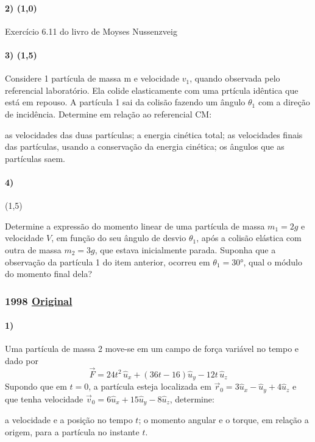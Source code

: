 \documentclass[12pt,a4paper]{article}
\newcommand{\original}[1]{\tiny \href{#1}{Original} \normalsize}
\begin{document}
\paragraph{2) (1,0)} Exercício 6.11 do livro de Moyses Nussenzveig

\paragraph{3) (1,5)} Considere 1 partícula de massa m e velocidade $v_1$, quando observada pelo referencial laboratório. Ela colide elasticamente com uma prtícula idêntica que está em repouso. A partícula 1 sai da colisão fazendo um ângulo $\theta _1$ com a direção de incidência. Determine em relação ao referencial CM:
\begin{tasks}
\task as velocidades das duas partículas;
\task a energia cinética total;
\task as velocidades finais das partículas, usando a conservação da energia cinética;
\task os ângulos que as partículas saem.
\end{tasks}

\paragraph{4)} (1,5)\\
\begin{tasks}
\task Determine a expressão do momento linear de uma partícula de massa $m_1 = 2g$ e velocidade $V$, em função do seu ângulo de desvio $\theta _1$, após a colisão elástica com outra de massa $m_2 = 3g$, que estava inicialmente parada.
\task Suponha que a observação da partícula 1 do item anterior, ocorreu em $\theta _1 = 30$°, qual o módulo do momento final dela?
\end{tasks}

\newpage
\subsubsection{1998 \original{https://drive.google.com/open?id=1d8g4f80ocnCaqNcMROtdYcwdZtZz8GYj}}

\paragraph{1)} Uma partícula de massa 2 move-se em um campo de força variável no tempo e dado por $$\overrightarrow{F} = 24t^2 \,\hat{u}_x + (36t-16)\hat{u}_y - 12t \,\hat{u} _z$$ Supondo que em $t = 0$, a partícula esteja localizada em $\vec{r}_0 = 3 \hat{u}_x - \hat{u}_y + 4\hat{u}_z$ e que tenha velocidade $\vec{v}_0 = 6\hat{u}_x + 15\hat{u}_y - 8\hat{u}_z$, determine:
\begin{tasks}
\task a velocidade e a posição no tempo $t$;
\task o momento angular e o torque, em relação a origem, para a partícula no instante $t$.
\end{tasks}
\end{document}
